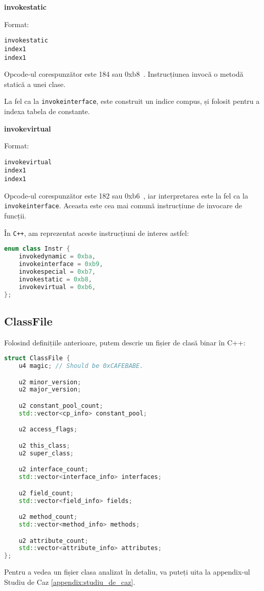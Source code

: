 \textbf{invokestatic}

Format:
\begin{verbatim}
invokestatic
index1
index1
\end{verbatim}

Opcode-ul corespunzător este 184 sau 0xb8~\cite{instruction_format}.
Instrucțiunea invocă o metodă statică a unei clase.

La fel ca la \texttt{invokeinterface}, este construit un indice compus,
și folosit pentru a indexa tabela de constante.

\textbf{invokevirtual}

Format:
\begin{verbatim}
invokevirtual
index1
index1
\end{verbatim}

Opcode-ul corespunzător este 182 sau 0xb6~\cite{instruction_format}, iar
interpretarea este la fel ca la \texttt{invokeinterface}.
Aceasta este cea mai comună
instrucțiune de invocare de funcții.

În \texttt{C++}, am reprezentat aceste instrucțiuni de interes astfel:

\begin{lstlisting}[language=C++]
enum class Instr {
    invokedynamic = 0xba,
    invokeinterface = 0xb9,
    invokespecial = 0xb7,
    invokestatic = 0xb8,
    invokevirtual = 0xb6,
};
\end{lstlisting}

\subsection{ClassFile}\label{classfile}

Folosind definițiile anterioare, putem descrie un fișier de clasă binar
în C++:

\begin{lstlisting}[language=C++]
struct ClassFile {
    u4 magic; // Should be 0xCAFEBABE.

    u2 minor_version;
    u2 major_version;

    u2 constant_pool_count;
    std::vector<cp_info> constant_pool;

    u2 access_flags;

    u2 this_class;
    u2 super_class;

    u2 interface_count;
    std::vector<interface_info> interfaces;

    u2 field_count;
    std::vector<field_info> fields;

    u2 method_count;
    std::vector<method_info> methods;

    u2 attribute_count;
    std::vector<attribute_info> attributes;
};
\end{lstlisting}

Pentru a vedea un fișier clasa analizat în detaliu, va puteți
uita la appendix-ul Studiu de Caz \ref{appendix:studiu_de_caz}.
